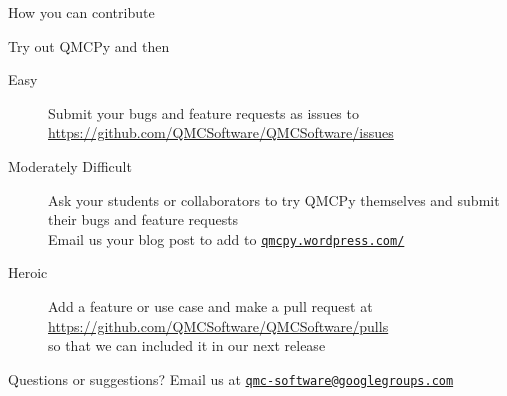 \documentclass[11pt,compress,xcolor={usenames,dvipsnames},aspectratio=169]{beamer}
\begin{document}
\begin{frame}{How you can contribute}
	
		\vspace{-3ex}
	Try out  QMCPy and then
	
			\vspace{-1ex}
	
	
	\begin{description}
		\item[Easy] Submit your bugs and feature requests as issues to \url{https://github.com/QMCSoftware/QMCSoftware/issues}
		
		\item[Moderately Difficult]  Ask your students or collaborators to try QMCPy themselves and submit their bugs and feature requests\\[1ex]
		
		Email us your blog post to add to \href{https://qmcpy.wordpress.com/}{\nolinkurl{qmcpy.wordpress.com/}}
		
		\item[Heroic] Add a feature or use case and make a pull request at \url{https://github.com/QMCSoftware/QMCSoftware/pulls} \\ so that we can included it in our next release
	\end{description}

		\vspace{-1ex}
	
	Questions or suggestions?  Email us at \href{mailto:qmc-software@googlegroups.com}{\nolinkurl{qmc-software@googlegroups.com}}
	
			\vspace{-1ex}
	

\end{frame}



\thankyouframe
\end{document}

